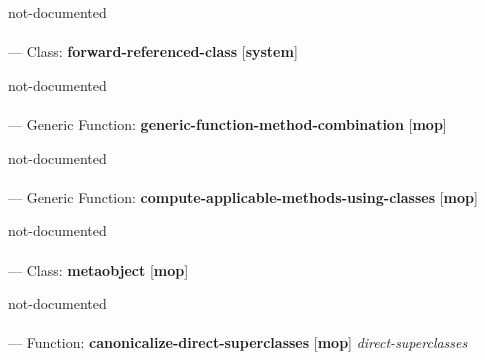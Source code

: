 \begin{adjustwidth}{5em}{5em}
not-documented
\end{adjustwidth}

\paragraph{}
\label{SYSTEM:FORWARD-REFERENCED-CLASS}
--- Class: \textbf{forward-referenced-class} [\textbf{system}] \textit{}

\begin{adjustwidth}{5em}{5em}
not-documented
\end{adjustwidth}

\paragraph{}
\label{MOP:GENERIC-FUNCTION-METHOD-COMBINATION}
--- Generic Function: \textbf{generic-function-method-combination} [\textbf{mop}] \textit{}

\begin{adjustwidth}{5em}{5em}
not-documented
\end{adjustwidth}

\paragraph{}
\label{MOP:COMPUTE-APPLICABLE-METHODS-USING-CLASSES}
--- Generic Function: \textbf{compute-applicable-methods-using-classes} [\textbf{mop}] \textit{}

\begin{adjustwidth}{5em}{5em}
not-documented
\end{adjustwidth}

\paragraph{}
\label{MOP:METAOBJECT}
--- Class: \textbf{metaobject} [\textbf{mop}] \textit{}

\begin{adjustwidth}{5em}{5em}
not-documented
\end{adjustwidth}

\paragraph{}
\label{MOP:CANONICALIZE-DIRECT-SUPERCLASSES}
--- Function: \textbf{canonicalize-direct-superclasses} [\textbf{mop}] \textit{direct-superclasses}

